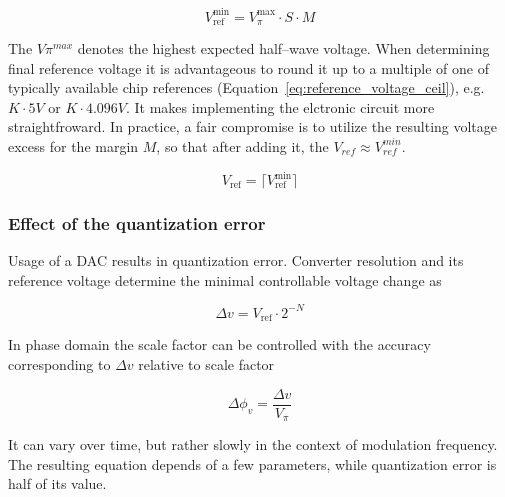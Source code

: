\documentclass{article}
\begin{document}
\begin{equation}
    V_{\text{ref}}^{\text{min}} = V_{\pi}^{\text{max}} \cdot S \cdot M
    \label{eq:minimum_reference_voltage}
\end{equation}

\noindent
The $V\pi^{max}$ denotes the highest expected half--wave voltage. When determining final reference voltage it is advantageous to round it up to a multiple of one of typically available chip references (Equation~\ref{eq:reference_voltage_ceil}), e.g. $K \cdot 5V$ or $K \cdot 4.096V$. It makes implementing the elctronic circuit more straightfroward. In practice, a fair compromise is to utilize the resulting voltage excess for the margin $M$, so that after adding it, the $V_{ref} \approx V_{ref}^{min}$.

\begin{equation}
    V_{\text{ref}} = \lceil V_{\text{ref}}^{\text{min}} \rceil
    \label{eq:reference_voltage_ceil}
\end{equation}

\subsubsection{Effect of the quantization error}
Usage of a DAC results in quantization error. Converter resolution and its reference voltage determine the minimal controllable voltage change as

\begin{equation}
    \Delta{}v = V_{\text{ref}} \cdot 2^{-N}
    \label{eq:dac_voltage_resolution}
\end{equation}

\noindent
In phase domain the scale factor can be controlled with the accuracy corresponding to $\Delta{}v$ relative to scale factor

\begin{equation}
    \Delta\phi_{v} = \frac{\Delta{}v}{V_\pi}
    \label{eq:relative_scale_factor_error2}
\end{equation}

\noindent
It can vary over time, but rather slowly in the context of modulation frequency. The resulting equation depends of a few parameters, while quantization error is half of its value.
\end{document}
